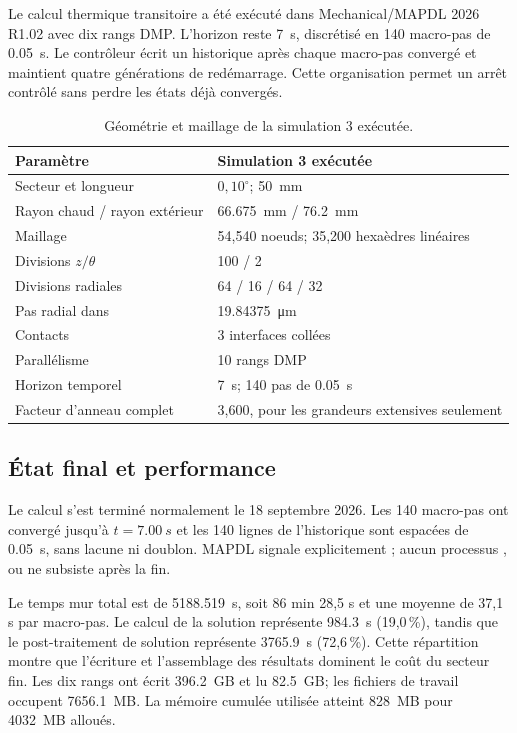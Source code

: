 \documentclass[oneside,openany]{amsdtx}
\begin{document}
Le calcul thermique transitoire a été exécuté dans Mechanical/MAPDL 2026 R1.02
avec dix rangs DMP. L'horizon reste \SI{7}{s}, discrétisé en 140 macro-pas de
\SI{0.05}{s}. Le contrôleur écrit un historique après chaque macro-pas
convergé et maintient quatre générations de redémarrage. Cette organisation
permet un arrêt contrôlé sans perdre les états déjà convergés.

\begin{table}[H]
\centering
\small
\renewcommand{\arraystretch}{1.15}
\begin{tabular}{L{0.43\textwidth}L{0.43\textwidth}}
\toprule
\textbf{Paramètre} & \textbf{Simulation 3 exécutée} \\
\midrule
Secteur et longueur & \(0{,}10^\circ\); \SI{50}{mm} \\
Rayon chaud / rayon extérieur & \SI{66.675}{mm} / \SI{76.2}{mm} \\
Maillage & 54,540 noeuds; 35,200 hexaèdres linéaires \\
Divisions \(z/\theta\) & 100 / 2 \\
Divisions radiales & 64 / 16 / 64 / 32 \\
Pas radial dans  & \SI{19.84375}{\micro m} \\
Contacts & 3 interfaces collées \\
Parallélisme & 10 rangs DMP \\
Horizon temporel & \SI{7}{s}; 140 pas de \SI{0.05}{s} \\
Facteur d'anneau complet & 3,600, pour les grandeurs extensives seulement \\
\bottomrule
\end{tabular}
\caption{Géométrie et maillage de la simulation 3 exécutée.}
\label{tab:sim3-configuration}
\end{table}

\subsection{État final et performance}

Le calcul s'est terminé normalement le 18 septembre 2026. Les 140 macro-pas
ont convergé jusqu'à \(t=\SI{7.00}{s}\) et les 140 lignes de l'historique sont
espacées de \SI{0.05}{s}, sans lacune ni doublon. MAPDL signale explicitement
; aucun processus ,  ou
 ne subsiste après la fin.

Le temps mur total est de \SI{5188.519}{s}, soit 86 min 28,5 s et une moyenne
de 37,1 s par macro-pas. Le calcul de la solution représente
\SI{984.3}{s} (19,0\,\%), tandis que le post-traitement de solution représente
\SI{3765.9}{s} (72,6\,\%). Cette répartition montre que l'écriture et
l'assemblage des résultats dominent le coût du secteur fin. Les dix rangs ont
écrit \SI{396.2}{GB} et lu \SI{82.5}{GB}; les fichiers de travail occupent
\SI{7656.1}{MB}. La mémoire cumulée utilisée atteint \SI{828}{MB} pour
\SI{4032}{MB} alloués.
\end{document}
